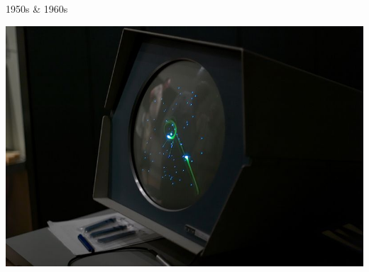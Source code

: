 \documentclass{lug}
\begin{document}
\begin{frame}{1950s \& 1960s}
\begin{minipage}{.35\textwidth}
        \includegraphics[width=\textwidth]{graphics/spacewar}
    \end{minipage}
\end{frame}
\end{document}
